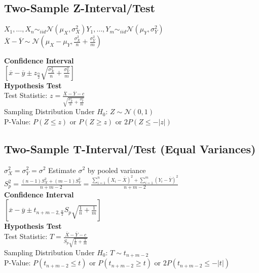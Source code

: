 \documentclass{article}
\begin{document}
\subsection{Two-Sample Z-Interval/Test}
\label{sec:equalVZ}
\begin{center}
    $X_1,\dots,X_n\sim_{iid}\mathcal{N}(\mu_X,\sigma_X^2)$\hspace*{0.5in}$Y_1,\dots,Y_m\sim_{iid}\mathcal{N}(\mu_Y,\sigma_Y^2)$\\
    $\overline{X}-\overline{Y}\sim\mathcal{N}(\mu_X-\mu_Y,\frac{\sigma_X^2}{n}+\frac{\sigma_Y^2}{m})$
\end{center}
\textbf{Confidence Interval}\\
$[\overline{x}-\overline{y}\pm z_\frac{\alpha}{2}\sqrt{\frac{\sigma_X^2}{n}+\frac{\sigma_Y^2}{m}}]$\\
\textbf{Hypothesis Test}\\
Test Statistic: $z=\frac{\overline{X}-\overline{Y}-c}{\sqrt{\frac{\sigma_X^2}{n}+\frac{\sigma_Y^2}{m}}}$\\
Sampling Distribution Under $H_0$: $Z\sim\mathcal{N}(0,1)$\\
P-Value: $P(Z\leq z)$ or $P(Z\geq z)$ or $2P(Z\leq-\vert z\vert)$
\subsection{Two-Sample T-Interval/Test (Equal Variances)}
\label{sec:equalVT}
$\sigma_X^2=\sigma_Y^2=\sigma^2$
Estimate $\sigma^2$ by pooled variance\\
$S_p^2=\frac{(n-1)S_X^2+(m-1)S_Y^2}{n+m-2}=\frac{\sum_{i=1}^n(X_i-\overline{X})^2+\sum_{i=1}^m(Y_i-\overline{Y})^2}{n+m-2}$\\
\textbf{Confidence Interval}\\
$[\overline{x}-\overline{y}\pm t_{n+m-2,\frac{\alpha}{2}}S_p\sqrt{\frac{1}{n}+\frac{1}{m}}]$\\
\textbf{Hypothesis Test}\\
Test Statistic: $T=\frac{\overline{X}-\overline{Y}-c}{S_p\sqrt{\frac{1}{n}+\frac{1}{m}}}$\\
Sampling Distribution Under $H_0$: $T\sim t_{n+m-2}$\\
P-Value: $P(t_{n+m-2}\leq t)$ or $P(t_{n+m-2}\geq t)$ or $2P(t_{n+m-2}\leq-\vert t\vert)$
\end{document}
